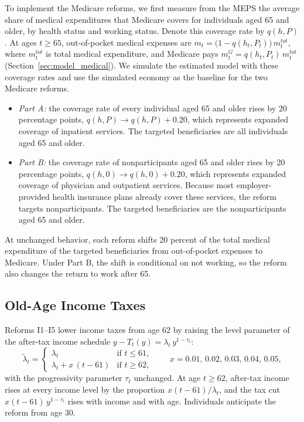 To implement the Medicare reforms, we first measure from the MEPS the average share of medical expenditures that Medicare covers for individuals aged 65 and older, by health status and working status. Denote this coverage rate by $q(h,P)$. At ages $t\geq65$, out-of-pocket medical expenses are $m_t=\big(1-q(h_t,P_t)\big)\,m^{tot}_t$, where $m^{tot}_t$ is total medical expenditure, and Medicare pays $m^{G}_t=q(h_t,P_t)\,m^{tot}_t$ (Section~\ref{sec:model_medical}). We simulate the estimated model with these coverage rates and use the simulated economy as the baseline for the two Medicare reforms.
\begin{itemize}
\item \textit{Part A:} the coverage rate of every individual aged 65 and older rises by 20 percentage points, $q(h,P)\to q(h,P)+0.20$, which represents expanded coverage of inpatient services. The targeted beneficiaries are all individuals aged 65 and older.
\item \textit{Part B:} the coverage rate of nonparticipants aged 65 and older rises by 20 percentage points, $q(h,0)\to q(h,0)+0.20$, which represents expanded coverage of physician and outpatient services. Because most employer-provided health insurance plans already cover these services, the reform targets nonparticipants. %
The targeted beneficiaries are the nonparticipants aged 65 and older.
\end{itemize}
At unchanged behavior, each reform shifts 20 percent of the total medical expenditure of the targeted beneficiaries from out-of-pocket expenses to Medicare. Under Part B, the shift is conditional on not working, so the reform also changes the return to work after 65.

\subsection{Old-Age Income Taxes}

Reforms I1--I5 lower income taxes from age 62 by raising the level parameter of the after-tax income schedule $y-T_t(y)=\lambda_t\,y^{1-\tau_t}$:
\begin{equation*}
\tilde\lambda_t=
\begin{cases}
\lambda_t & \text{if } t\leq 61,\\
\lambda_t+x\,(t-61) & \text{if } t\geq 62,
\end{cases}
\qquad x=0.01,\,0.02,\,0.03,\,0.04,\,0.05,
\end{equation*}
with the progressivity parameter $\tau_t$ unchanged. %
At age $t\geq62$, after-tax income rises at every income level by the proportion $x(t-61)/\lambda_t$, and the tax cut $x(t-61)\,y^{1-\tau_t}$ rises with income and with age. Individuals anticipate the reform from age 30.

